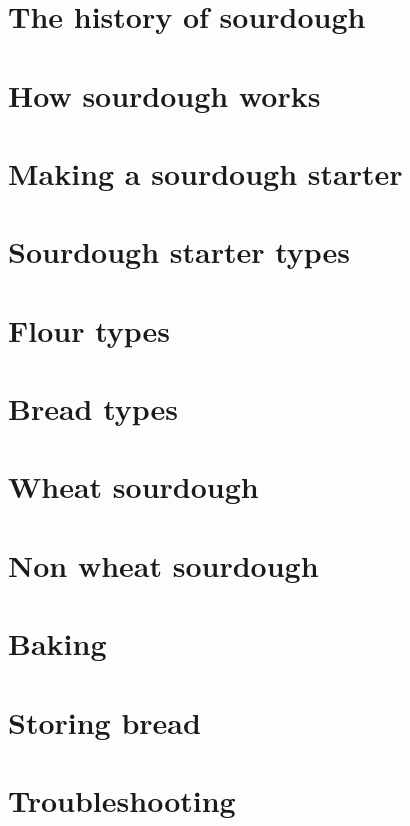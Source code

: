 \documentclass[a4paper, 12pt]{book}
\begin{document}
\mainmatter

\chapter{The history of sourdough}


\chapter{How sourdough works}


\chapter{Making a sourdough starter}


\chapter{Sourdough starter types}


\chapter{Flour types}


\chapter{Bread types}


\chapter{Wheat sourdough}%
\label{chapter:wheat-sourdough}


\chapter{Non wheat sourdough}%
\label{chapter:non-wheat-sourdough}


\chapter{Baking}%
\label{chapter:baking}


\chapter{Storing bread}%
\label{chapter:storing-bread}


\chapter{Troubleshooting}



\printbibliography
\end{document}
